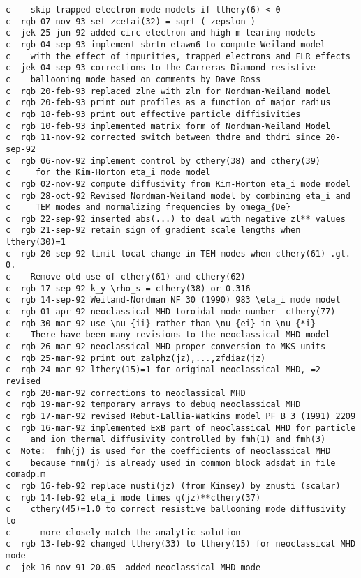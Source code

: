 \begin{verbatim}
c    skip trapped electron mode models if lthery(6) < 0
c  rgb 07-nov-93 set zcetai(32) = sqrt ( zepslon )
c  jek 25-jun-92 added circ-electron and high-m tearing models
c  rgb 04-sep-93 implement sbrtn etawn6 to compute Weiland model
c    with the effect of impurities, trapped electrons and FLR effects
c  jek 04-sep-93 corrections to the Carreras-Diamond resistive
c    ballooning mode based on comments by Dave Ross
c  rgb 20-feb-93 replaced zlne with zln for Nordman-Weiland model
c  rgb 20-feb-93 print out profiles as a function of major radius
c  rgb 18-feb-93 print out effective particle diffisivities
c  rgb 10-feb-93 implemented matrix form of Nordman-Weiland Model
c  rgb 11-nov-92 corrected switch between thdre and thdri since 20-sep-92
c  rgb 06-nov-92 implement control by cthery(38) and cthery(39)
c     for the Kim-Horton eta_i mode model
c  rgb 02-nov-92 compute diffusivity from Kim-Horton eta_i mode model
c  rgb 28-oct-92 Revised Nordman-Weiland model by combining eta_i and
c     TEM modes and normalizing frequencies by omega_{De}
c  rgb 22-sep-92 inserted abs(...) to deal with negative zl** values
c  rgb 21-sep-92 retain sign of gradient scale lengths when lthery(30)=1
c  rgb 20-sep-92 limit local change in TEM modes when cthery(61) .gt. 0.
c    Remove old use of cthery(61) and cthery(62)
c  rgb 17-sep-92 k_y \rho_s = cthery(38) or 0.316
c  rgb 14-sep-92 Weiland-Nordman NF 30 (1990) 983 \eta_i mode model
c  rgb 01-apr-92 neoclassical MHD toroidal mode number  cthery(77)
c  rgb 30-mar-92 use \nu_{ii} rather than \nu_{ei} in \nu_{*i}
c    There have been many revisions to the neoclassical MHD model
c  rgb 26-mar-92 neoclassical MHD proper conversion to MKS units
c  rgb 25-mar-92 print out zalphz(jz),...,zfdiaz(jz)
c  rgb 24-mar-92 lthery(15)=1 for original neoclassical MHD, =2 revised
c  rgb 20-mar-92 corrections to neoclassical MHD
c  rgb 19-mar-92 temporary arrays to debug neoclassical MHD
c  rgb 17-mar-92 revised Rebut-Lallia-Watkins model PF B 3 (1991) 2209
c  rgb 16-mar-92 implemented ExB part of neoclassical MHD for particle
c    and ion thermal diffusivity controlled by fmh(1) and fmh(3)
c  Note:  fmh(j) is used for the coefficients of neoclassical MHD 
c    because fnm(j) is already used in common block adsdat in file comadp.m
c  rgb 16-feb-92 replace nusti(jz) (from Kinsey) by znusti (scalar)
c  rgb 14-feb-92 eta_i mode times q(jz)**cthery(37)
c    cthery(45)=1.0 to correct resistive ballooning mode diffusivity to
c      more closely match the analytic solution
c  rgb 13-feb-92 changed lthery(33) to lthery(15) for neoclassical MHD mode
c  jek 16-nov-91 20.05  added neoclassical MHD mode

\end{verbatim}
